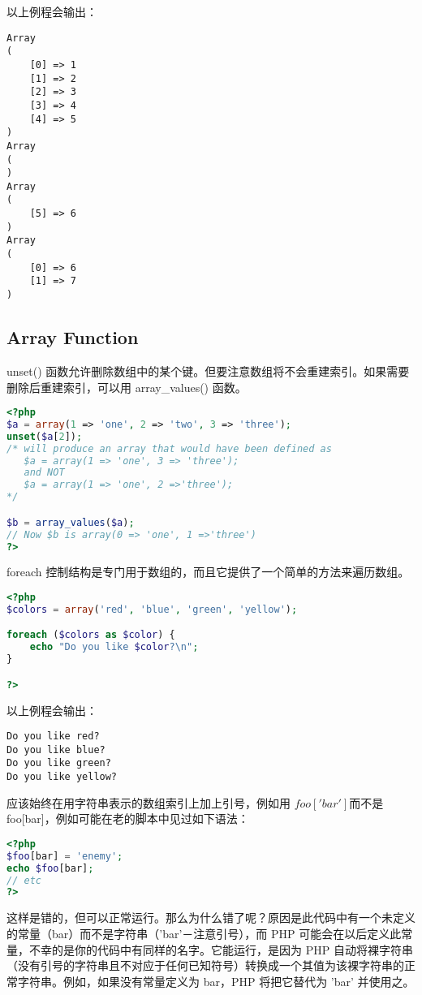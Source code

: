 以上例程会输出：


\begin{verbatim}
Array
(
    [0] => 1
    [1] => 2
    [2] => 3
    [3] => 4
    [4] => 5
)
Array
(
)
Array
(
    [5] => 6
)
Array
(
    [0] => 6
    [1] => 7
)
\end{verbatim}

\subsection{Array Function}

unset() 函数允许删除数组中的某个键。但要注意数组将不会重建索引。如果需要删除后重建索引，可以用 array\_values() 函数。

\begin{lstlisting}[language=PHP]
<?php
$a = array(1 => 'one', 2 => 'two', 3 => 'three');
unset($a[2]);
/* will produce an array that would have been defined as
   $a = array(1 => 'one', 3 => 'three');
   and NOT
   $a = array(1 => 'one', 2 =>'three');
*/

$b = array_values($a);
// Now $b is array(0 => 'one', 1 =>'three')
?>
\end{lstlisting}

foreach 控制结构是专门用于数组的，而且它提供了一个简单的方法来遍历数组。

\begin{lstlisting}[language=PHP]
<?php
$colors = array('red', 'blue', 'green', 'yellow');

foreach ($colors as $color) {
    echo "Do you like $color?\n";
}

?>
\end{lstlisting}

以上例程会输出：


\begin{verbatim}
Do you like red?
Do you like blue?
Do you like green?
Do you like yellow?
\end{verbatim}

应该始终在用字符串表示的数组索引上加上引号，例如用 $foo['bar'] 而不是 $foo[bar]，例如可能在老的脚本中见过如下语法：

\begin{lstlisting}[language=PHP]
<?php
$foo[bar] = 'enemy';
echo $foo[bar];
// etc
?>
\end{lstlisting}


这样是错的，但可以正常运行。那么为什么错了呢？原因是此代码中有一个未定义的常量（bar）而不是字符串（'bar'－注意引号），而 PHP 可能会在以后定义此常量，不幸的是你的代码中有同样的名字。它能运行，是因为 PHP 自动将裸字符串（没有引号的字符串且不对应于任何已知符号）转换成一个其值为该裸字符串的正常字符串。例如，如果没有常量定义为 bar，PHP 将把它替代为 'bar' 并使用之。

